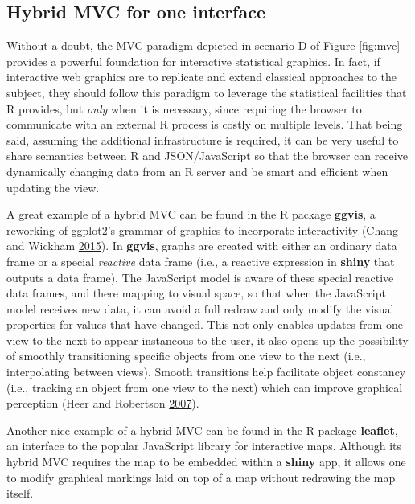 \documentclass[12pt,]{isuthesis}
\begin{document}
\subsection{Hybrid MVC for one
interface}\label{hybrid-mvc-for-one-interface}

Without a doubt, the MVC paradigm depicted in scenario D of Figure
\ref{fig:mvc} provides a powerful foundation for interactive statistical
graphics. In fact, if interactive web graphics are to replicate and
extend classical approaches to the subject, they should follow this
paradigm to leverage the statistical facilities that R provides, but
\emph{only} when it is necessary, since requiring the browser to
communicate with an external R process is costly on multiple levels.
That being said, assuming the additional infrastructure is required, it
can be very useful to share semantics between R and JSON/JavaScript so
that the browser can receive dynamically changing data from an R server
and be smart and efficient when updating the view.

A great example of a hybrid MVC can be found in the R package
\textbf{ggvis}, a reworking of ggplot2's grammar of graphics to
incorporate interactivity (Chang and Wickham
\protect\hyperlink{ref-ggvis}{2015}). In \textbf{ggvis}, graphs are
created with either an ordinary data frame or a special \emph{reactive}
data frame (i.e., a reactive expression in \textbf{shiny} that outputs a
data frame). The JavaScript model is aware of these special reactive
data frames, and there mapping to visual space, so that when the
JavaScript model receives new data, it can avoid a full redraw and only
modify the visual properties for values that have changed. This not only
enables updates from one view to the next to appear instaneous to the
user, it also opens up the possibility of smoothly transitioning
specific objects from one view to the next (i.e., interpolating between
views). Smooth transitions help facilitate object constancy (i.e.,
tracking an object from one view to the next) which can improve
graphical perception (Heer and Robertson
\protect\hyperlink{ref-animated-transitions}{2007}).

Another nice example of a hybrid MVC can be found in the R package
\textbf{leaflet}, an interface to the popular JavaScript library for
interactive maps. Although its hybrid MVC requires the map to be
embedded within a \textbf{shiny} app, it allows one to modify graphical
markings laid on top of a map without redrawing the map itself.
\end{document}
